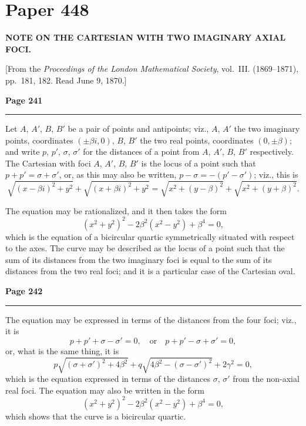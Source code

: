\documentclass[12pt,a4paper]{article}
\theoremstyle{plain}
\theoremstyle{definition}
\theoremstyle{remark}
\begin{document}
\newpage
\section*{Paper 448}

\begin{center}
\textbf{NOTE ON THE CARTESIAN WITH TWO IMAGINARY AXIAL FOCI.}
\end{center}

\begin{center}
[From the \textit{Proceedings of the London Mathematical Society}, vol.~\textsc{III}. (1869--1871), pp.~181, 182. Read June 9, 1870.]
\end{center}

\newpage
\noindent\textbf{Page 241}\\
\noindent\rule{\textwidth}{0.4pt}

\smallskip

\noindent Let $A$, $A'$, $B$, $B'$ be a pair of points and antipoints; viz., $A$, $A'$ the two imaginary points, coordinates $(\pm \beta i, 0)$, $B$, $B'$ the two real points, coordinates $(0, \pm \beta)$; and write $p$, $p'$, $\sigma$, $\sigma'$ for the distances of a point from $A$, $A'$, $B$, $B'$ respectively. The Cartesian with foci $A$, $A'$, $B$, $B'$ is the locus of a point such that $p + p' = \sigma + \sigma'$, or, as this may also be written, $p - \sigma = -(p' - \sigma')$; viz., this is
\[
\sqrt{(x - \beta i)^2 + y^2} + \sqrt{(x + \beta i)^2 + y^2} = \sqrt{x^2 + (y - \beta)^2} + \sqrt{x^2 + (y + \beta)^2}.
\]

\noindent The equation may be rationalized, and it then takes the form
\[
(x^2 + y^2)^2 - 2\beta^2 (x^2 - y^2) + \beta^4 = 0,
\]
which is the equation of a bicircular quartic symmetrically situated with respect to the axes. The curve may be described as the locus of a point such that the sum of its distances from the two imaginary foci is equal to the sum of its distances from the two real foci; and it is a particular case of the Cartesian oval.

\newpage
\noindent\textbf{Page 242}\\
\noindent\rule{\textwidth}{0.4pt}

\smallskip

\noindent The equation may be expressed in terms of the distances from the four foci; viz., it is
\[
p + p' + \sigma - \sigma' = 0, \quad \text{or} \quad p + p' - \sigma + \sigma' = 0,
\]
or, what is the same thing, it is
\[
p \sqrt{(\sigma + \sigma')^2 + 4\beta^2} + q \sqrt{4\beta^2 - (\sigma - \sigma')^2} + 2\gamma^2 = 0,
\]
which is the equation expressed in terms of the distances $\sigma$, $\sigma'$ from the non-axial real foci. The equation may also be written in the form
\[
(x^2 + y^2)^2 - 2\beta^2 (x^2 - y^2) + \beta^4 = 0,
\]
which shows that the curve is a bicircular quartic.
\end{document}
